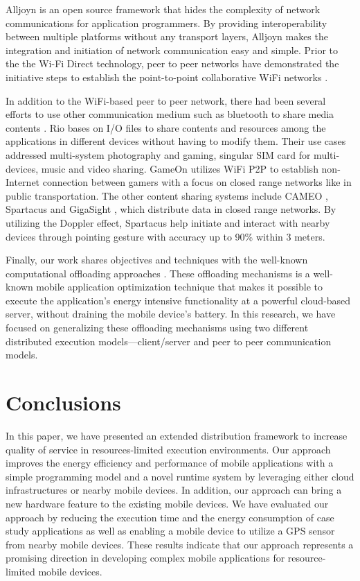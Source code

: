 \documentclass{sig-alternate}[10pt]
\begin{document}
Alljoyn \cite{alljoyn} is an open source framework that hides the complexity of network communications for application programmers. By providing interoperability between multiple platforms without any transport layers, Alljoyn makes the integration and initiation of network communication easy and simple. Prior to the the Wi-Fi Direct technology, peer to peer networks have demonstrated the initiative steps to establish the point-to-point collaborative WiFi networks \cite{m_p2p_tutor}. 

In addition to the WiFi-based peer to peer network, there had been several efforts to use other communication medium such as bluetooth to share media contents \cite{media_share}. Rio \cite{rio} bases on I/O files to share contents and resources among the applications in different devices without having to modify them. Their use cases addressed multi-system photography and gaming, singular SIM card for multi-devices, music and video sharing. GameOn \cite{gameon} utilizes WiFi P2P to establish non-Internet connection between gamers with a focus on closed range networks like in public transportation. The other content sharing systems include CAMEO \cite{cameo}, Spartacus \cite{spartacus} and GigaSight \cite{crowd-sourcing}, which distribute data in closed range networks. By utilizing the Doppler effect, Spartacus help initiate and interact with nearby devices through pointing gesture with accuracy up to 90\% within 3 meters.

Finally, our work shares objectives and techniques with the well-known computational offloading approaches \cite{maui,comet,mobile-cloud-middleware,fuzzy-engine}. These offloading mechanisms is a well-known mobile application optimization technique that makes it possible to execute the application’s energy intensive functionality at a powerful cloud-based server, without draining the mobile device’s battery. In this research, we have focused on generalizing these offloading mechanisms using two different distributed execution models---client/server and peer to peer communication models.

\section{Conclusions}
\label{sec:conc}
%
In this paper, we have presented an extended distribution framework to increase quality of service in resources-limited execution environments. Our approach improves the energy efficiency and performance of mobile applications with a simple programming model and a novel runtime system by leveraging either cloud infrastructures or nearby mobile devices. In addition, our approach can bring a new hardware feature to the existing mobile devices. We have evaluated our approach by reducing the execution time and the energy consumption of case study applications as well as enabling a mobile device to utilize a GPS sensor from nearby mobile devices. These results indicate that our approach represents a promising direction in developing complex mobile applications for resource-limited mobile devices.


\balance


\end{document}
